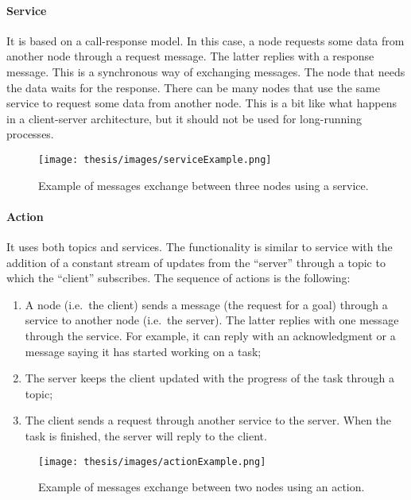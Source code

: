 \documentclass[../thesis.tex]{subfiles}
\begin{document}
\paragraph{Service}
It is based on a call-response model. In this case, a node requests some data from another node through a request message. The latter replies with a response message. This is a synchronous way of exchanging messages. The node that needs the data waits for the response. There can be many nodes that use the same service to request some data from another node. This is a bit like what happens in a client-server architecture, but it should not be used for long-running processes. 
\begin{figure}[H]
    \centering
    \texttt{[image: thesis/images/serviceExample.png]}
    \caption{Example of messages exchange between three nodes using a service.}
    \label{fig:exampleServiceExchangeMessage}
\end{figure}

\paragraph{Action}\label{p:exchange_message_with_actions}
It uses both topics and services. The functionality is similar to service with the addition of a constant stream of updates from the ``server'' through a topic to which the ``client'' subscribes. The sequence of actions is the following: 
    \begin{enumerate}
        \item A node (i.e.\ the client) sends a message (the request for a goal) through a service to another node  (i.e.\ the server). The latter replies with one message through the service. For example, it can reply with an acknowledgment or a message saying it has started working on a task; 
        \item The server keeps the client updated with the progress of the task through a topic; 
        \item The client sends a request through another service to the server. When the task is finished, the server will reply to the client. 
    \end{enumerate}
\begin{figure}[H]
    \centering
    \texttt{[image: thesis/images/actionExample.png]}
    \caption{Example of messages exchange between two nodes using an action.}
    \label{fig:exampleActionExchangeMessage}
\end{figure}
\end{document}
